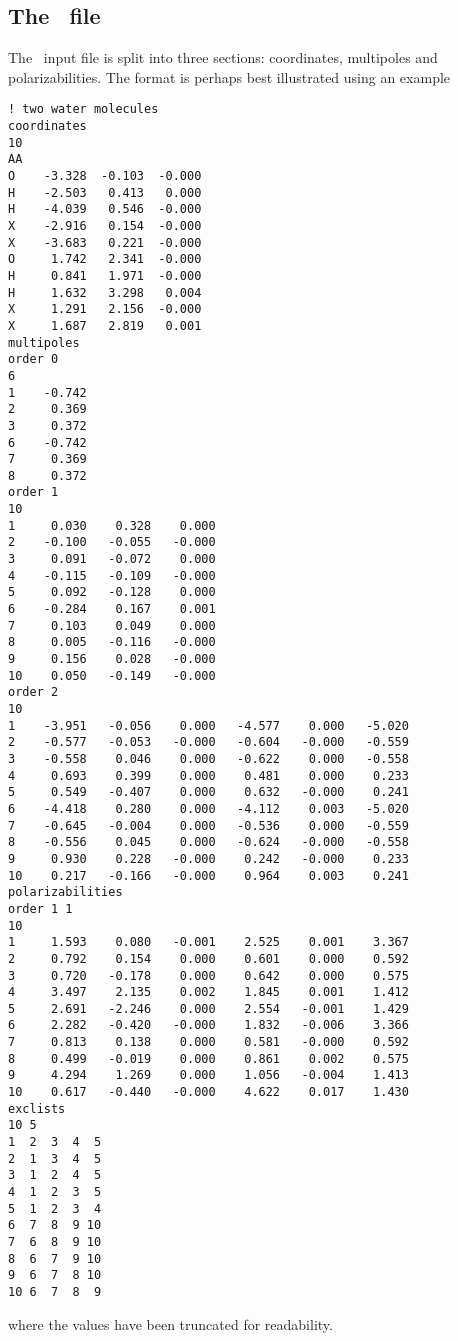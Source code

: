 \subsection*{The \pot\ file}
The \pot\ input file is split into three sections: coordinates, multipoles and polarizabilities. The format is perhaps best illustrated using an example
\begin{verbatim}
! two water molecules
coordinates
10
AA
O    -3.328  -0.103  -0.000
H    -2.503   0.413   0.000
H    -4.039   0.546  -0.000
X    -2.916   0.154  -0.000
X    -3.683   0.221  -0.000
O     1.742   2.341  -0.000
H     0.841   1.971  -0.000
H     1.632   3.298   0.004
X     1.291   2.156  -0.000
X     1.687   2.819   0.001
multipoles
order 0
6
1    -0.742
2     0.369
3     0.372
6    -0.742
7     0.369
8     0.372
order 1
10
1     0.030    0.328    0.000
2    -0.100   -0.055   -0.000
3     0.091   -0.072    0.000
4    -0.115   -0.109   -0.000
5     0.092   -0.128    0.000
6    -0.284    0.167    0.001
7     0.103    0.049    0.000
8     0.005   -0.116   -0.000
9     0.156    0.028   -0.000
10    0.050   -0.149   -0.000
order 2
10
1    -3.951   -0.056    0.000   -4.577    0.000   -5.020
2    -0.577   -0.053   -0.000   -0.604   -0.000   -0.559
3    -0.558    0.046    0.000   -0.622    0.000   -0.558
4     0.693    0.399    0.000    0.481    0.000    0.233
5     0.549   -0.407    0.000    0.632   -0.000    0.241
6    -4.418    0.280    0.000   -4.112    0.003   -5.020
7    -0.645   -0.004    0.000   -0.536    0.000   -0.559
8    -0.556    0.045    0.000   -0.624   -0.000   -0.558
9     0.930    0.228   -0.000    0.242   -0.000    0.233
10    0.217   -0.166   -0.000    0.964    0.003    0.241
polarizabilities
order 1 1
10
1     1.593    0.080   -0.001    2.525    0.001    3.367
2     0.792    0.154    0.000    0.601    0.000    0.592
3     0.720   -0.178    0.000    0.642    0.000    0.575
4     3.497    2.135    0.002    1.845    0.001    1.412
5     2.691   -2.246    0.000    2.554   -0.001    1.429
6     2.282   -0.420   -0.000    1.832   -0.006    3.366
7     0.813    0.138    0.000    0.581   -0.000    0.592
8     0.499   -0.019    0.000    0.861    0.002    0.575
9     4.294    1.269    0.000    1.056   -0.004    1.413
10    0.617   -0.440   -0.000    4.622    0.017    1.430
exclists
10 5
1  2  3  4  5
2  1  3  4  5
3  1  2  4  5
4  1  2  3  5
5  1  2  3  4
6  7  8  9 10
7  6  8  9 10
8  6  7  9 10
9  6  7  8 10
10 6  7  8  9
\end{verbatim}
where the values have been truncated for readability.

